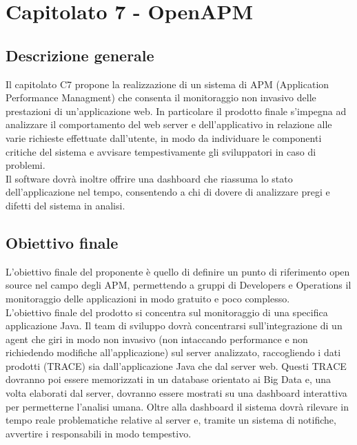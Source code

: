 \documentclass[StudioDiFattibilità.tex]{subfiles}
\begin{document}
\chapter{Capitolato 7 - OpenAPM}
\section{Descrizione generale}
Il capitolato C7 propone la realizzazione di un sistema di APM (Application Performance Managment) che consenta il monitoraggio non invasivo delle prestazioni di un'applicazione web. In particolare il prodotto finale s'impegna ad analizzare il comportamento del web server e dell'applicativo in relazione alle varie richieste effettuate dall'utente, in modo da individuare le componenti critiche del sistema e avvisare tempestivamente gli sviluppatori in caso di problemi.\\
Il software dovrà inoltre offrire una dashboard che riassuma lo stato dell'applicazione nel tempo, consentendo a chi di dovere di analizzare pregi e difetti del sistema in analisi.
\section{Obiettivo finale}
L'obiettivo finale del proponente è quello di definire un punto di riferimento open source nel campo degli APM, permettendo a gruppi di Developers e Operations il monitoraggio delle applicazioni in modo gratuito e poco complesso.\\
L'obiettivo finale del prodotto si concentra sul monitoraggio di una specifica applicazione Java. Il team di sviluppo dovrà concentrarsi sull'integrazione di un agent che giri in modo non invasivo (non intaccando performance e non richiedendo modifiche all'applicazione) sul server analizzato, raccogliendo i dati prodotti (TRACE) sia dall'applicazione Java che dal server web. Questi TRACE dovranno poi essere memorizzati in un database orientato ai Big Data e, una volta elaborati dal server, dovranno essere mostrati su una dashboard interattiva per permetterne l'analisi umana. Oltre alla dashboard il sistema dovrà rilevare in tempo reale problematiche relative al server e, tramite un sistema di notifiche, avvertire i responsabili in modo tempestivo.
\end{document}
